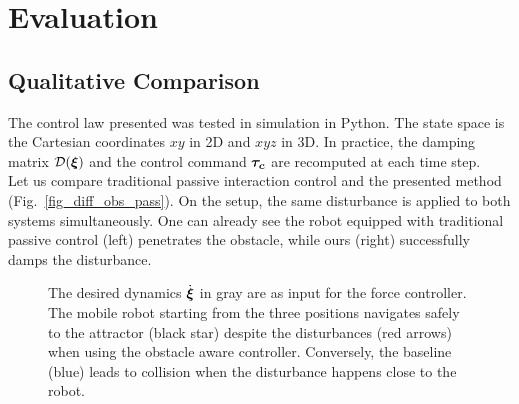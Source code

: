 \documentclass[conference]{IEEEtran}
\begin{document}

\section{Evaluation}  \label{sec:evaluation}

\subsection{Qualitative Comparison} \label{sec:qual_comp}
The control law presented was tested in simulation in Python. The state space is the Cartesian coordinates $xy$ in 2D and $xyz$ in 3D. In practice, the damping matrix $\mathcal{D}(\boldsymbol{\xi})$ and the control command $\boldsymbol{\tau_c}$ are recomputed at each time step.\\

Let us compare traditional passive interaction control and the presented method (Fig.~\ref{fig_diff_obs_pass}). On the setup, the same disturbance is applied to both systems simultaneously. One can already see the robot equipped with traditional passive control (left) penetrates the obstacle, while ours (right) successfully damps the disturbance.


\begin{figure}
  \centering
  \centerline{}
  \caption{The desired dynamics $\dot{\boldsymbol{\xi}}$ in gray are as input for the force controller. 
  The mobile robot starting from the three positions navigates safely to the attractor (black star) despite the disturbances (red arrows) when using the obstacle aware controller.
  Conversely, the baseline (blue) leads to collision when the disturbance happens close to the robot.}
  \label{fig:obstacle_aware_damping_comparison}
\end{figure}
\end{document}
